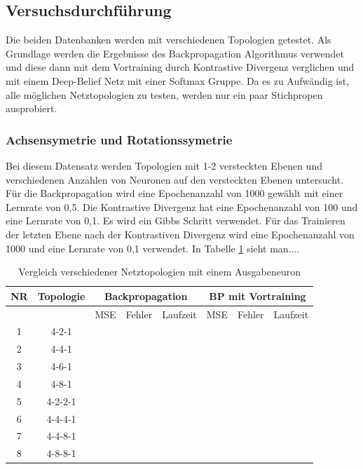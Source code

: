 \documentclass[12pt]{article}
\begin{document}
\subsection{Versuchsdurchführung}
Die beiden Datenbanken werden mit verschiedenen Topologien getestet. Als Grundlage werden die Ergebnisse des Backpropagation Algorithmus verwendet und diese dann mit dem Vortraining durch Kontrastive Divergenz verglichen und mit einem Deep-Belief Netz mit einer Softmax Gruppe. Da es zu Aufwändig ist, alle möglichen Netztopologien zu testen, werden nur ein paar Stichpropen ausprobiert.

\subsubsection{Achsensymetrie und Rotationssymetrie}
Bei diesem Datensatz werden Topologien mit 1-2 versteckten Ebenen und verschiedenen Anzahlen von Neuronen auf den versteckten Ebenen untersucht. Für die Backpropagation wird eine Epochenanzahl von 1000 gewählt mit einer Lernrate von 0,5. Die Kontrastive Divergenz hat eine Epochenanzahl von 100 und eine Lernrate von 0,1. Es wird ein Gibbs Schritt verwendet. Für das Trainieren der letzten Ebene nach der Kontrastiven Divergenz wird eine Epochenanzahl von 1000 und eine Lernrate von 0,1 verwendet. In Tabelle \ref{sigmoid} sieht man....
\begin{table}[H]


\begin{tabularx}{\textwidth}{|c|c|X|X|X|X|X|X|}
	\hline
	NR & Topologie & \multicolumn{3}{|c|}{Backpropagation} & \multicolumn{3}{|c|}{BP mit Vortraining} \\\hline
	&&MSE& Fehler&Laufzeit&MSE& Fehler&Laufzeit
	\\\hline
	1&4-2-1&&&&&&\\\hline
	2&4-4-1&&&&&&\\\hline
	3&4-6-1&&&&&&\\\hline
	4&4-8-1&&&&&&\\\hline
	5&4-2-2-1&&&&&&\\\hline
	6&4-4-4-1&&&&&&\\\hline
	7&4-4-8-1&&&&&&\\\hline
	8&4-8-8-1&&&&&&\\\hline
	\end{tabularx}
	\caption{Vergleich verschiedener Netztopologien mit einem Ausgabeneuron}
	\label{sigmoid}
	\end{table}
	
	
	
\end{document}
